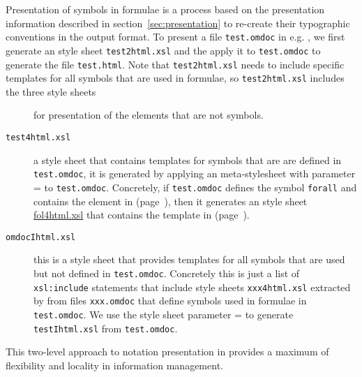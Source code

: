 Presentation of {\openmath} symbols in formulae is a process based on the
presentation information described in section~\ref{sec:presentation} to re-create
their typographic conventions in the output format. To present a file
{\tt{test.omdoc}} in e.g. {\html}, we first generate an {\xslt} style sheet
{\tt{test2html.xsl}} and the apply it to {\tt{test.omdoc}} to generate the {\html}
file {\tt{test.html}}. Note that {\tt{test2html.xsl}} needs to include specific
{\xslt} templates for all symbols that are used in formulae, so
{\tt{test2html.xsl}} includes the three style sheets 
\begin{description}
\item[{}] for presentation of the {\omdoc} elements that are
  not symbols.
\item[{\tt{test4html.xsl}}] a style sheet that contains templates for symbols that
  are are defined in {\tt{test.omdoc}}, it is generated by applying an {\xslt}
  meta-stylesheet {} with parameter {} =
  {} to {\tt{test.omdoc}}. Concretely, if {\tt{test.omdoc}} defines the
  symbol {\tt{forall}} and contains the {} element in
  {} (page~\pageref{fig:ombind-presentation}), then it
  generates an {\xslt} style sheet {\url{fol4html.xsl}} that contains the template
  in {} (page~\pageref{fig:template}).
\item[{\tt{omdocIhtml.xsl}}] this is a style sheet that provides templates for all
  symbols that are used but not defined in {\tt{test.omdoc}}. Concretely this is
  just a list of {\xslt} {\tt{xsl:include}} statements that include style sheets
  {\tt{xxx4html.xsl}} extracted by {} from files {\tt{xxx.omdoc}}
  that define symbols used in formulae in {\tt{test.omdoc}}. We use the style
  sheet {} parameter {} = {} to generate
  {\tt{testIhtml.xsl}} from {\tt{test.omdoc}}.
\end{description}
This two-level approach to notation presentation in {\omdoc} provides a maximum of
flexibility and locality in information management.

\begin{projectdescription}
  
\end{projectdescription}

\begin{projectdescription}
  
\end{projectdescription}


\begin{projectdescription}
  
\end{projectdescription}





